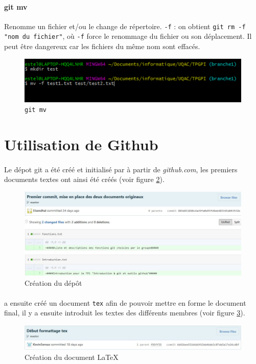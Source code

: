 \documentclass[11pt,canadien]{article}
\begin{document}
\paragraph{git mv}Renomme un fichier et/ou le change de répertoire. \texttt{-f} : on obtient \texttt{git rm -f "nom du fichier"}, où \texttt{-f} force le renommage du fichier ou son déplacement. Il peut être dangereux car les fichiers du même nom sont effacés.
\begin{figure}
	\centering
	\includegraphics{images/git_mv_-f}
	\caption{\texttt{git mv}}
	\label{fig:git_mv}
\end{figure}

\FloatBarrier %
\section{Utilisation de Github}

\paragraph{}Le dépot git a été créé et initialisé par \joffrey à partir de \textit{github.com}, les premiers documents textes ont ainsi été créés (voir figure \ref{fig:InitDepot}).
\begin{figure}
	\centering
	\includegraphics[width=\textwidth]{images/initialisation_depot.JPG}
	\caption{Création du dépôt}
	\label{fig:InitDepot}
\end{figure}

\paragraph{}\kevin a ensuite créé un document \texttt{tex} afin de pouvoir mettre en forme le document final, il y a ensuite introduit les textes des différents membres (voir figure \ref{fig:InitLatex}).
\begin{figure}
	\centering
	\includegraphics[width=\textwidth]{images/initialisation_tex.JPG}
	\caption{Création du document \LaTeX}
	\label{fig:InitLatex}
\end{figure}
\end{document}
